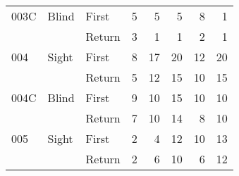 \begin{table}[!htb]
\begin{tabular}{lllrrrrr}
003C & Blind & First &    5 &     5 &                                                     5 &                                                      8 &       1 \\
    &       & Return &    3 &     1 &                                                     1 &                                                      2 &       1 \\
004 & Sight & First &    8 &    17 &                                                    20 &                                                     12 &      20 \\
    &       & Return &    5 &    12 &                                                    15 &                                                     10 &      15 \\
004C & Blind & First &    9 &    10 &                                                    15 &                                                     10 &      10 \\
    &       & Return &    7 &    10 &                                                    14 &                                                      8 &      10 \\
005 & Sight & First &    2 &     4 &                                                    12 &                                                     10 &      13 \\
    &       & Return &    2 &     6 &                                                    10 &                                                      6 &      12 \\
\bottomrule
\end{tabular}
\end{table}

